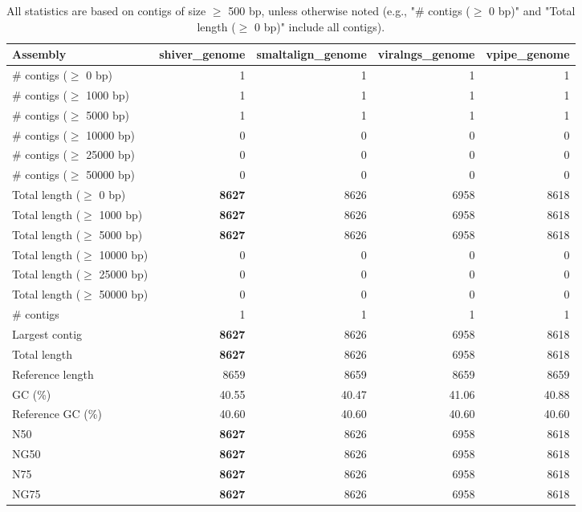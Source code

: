 \documentclass[12pt,a4paper]{article}
\begin{document}
\begin{table}[ht]
\begin{center}
\caption{All statistics are based on contigs of size $\geq$ 500 bp, unless otherwise noted (e.g., "\# contigs ($\geq$ 0 bp)" and "Total length ($\geq$ 0 bp)" include all contigs).}
\begin{tabular}{|l*{4}{|r}|}
\hline
Assembly & shiver\_genome & smaltalign\_genome & viralngs\_genome & vpipe\_genome \\ \hline
\# contigs ($\geq$ 0 bp) & 1 & 1 & 1 & 1 \\ \hline
\# contigs ($\geq$ 1000 bp) & 1 & 1 & 1 & 1 \\ \hline
\# contigs ($\geq$ 5000 bp) & 1 & 1 & 1 & 1 \\ \hline
\# contigs ($\geq$ 10000 bp) & 0 & 0 & 0 & 0 \\ \hline
\# contigs ($\geq$ 25000 bp) & 0 & 0 & 0 & 0 \\ \hline
\# contigs ($\geq$ 50000 bp) & 0 & 0 & 0 & 0 \\ \hline
Total length ($\geq$ 0 bp) & {\bf 8627} & 8626 & 6958 & 8618 \\ \hline
Total length ($\geq$ 1000 bp) & {\bf 8627} & 8626 & 6958 & 8618 \\ \hline
Total length ($\geq$ 5000 bp) & {\bf 8627} & 8626 & 6958 & 8618 \\ \hline
Total length ($\geq$ 10000 bp) & 0 & 0 & 0 & 0 \\ \hline
Total length ($\geq$ 25000 bp) & 0 & 0 & 0 & 0 \\ \hline
Total length ($\geq$ 50000 bp) & 0 & 0 & 0 & 0 \\ \hline
\# contigs & 1 & 1 & 1 & 1 \\ \hline
Largest contig & {\bf 8627} & 8626 & 6958 & 8618 \\ \hline
Total length & {\bf 8627} & 8626 & 6958 & 8618 \\ \hline
Reference length & 8659 & 8659 & 8659 & 8659 \\ \hline
GC (\%) & 40.55 & 40.47 & 41.06 & 40.88 \\ \hline
Reference GC (\%) & 40.60 & 40.60 & 40.60 & 40.60 \\ \hline
N50 & {\bf 8627} & 8626 & 6958 & 8618 \\ \hline
NG50 & {\bf 8627} & 8626 & 6958 & 8618 \\ \hline
N75 & {\bf 8627} & 8626 & 6958 & 8618 \\ \hline
NG75 & {\bf 8627} & 8626 & 6958 & 8618 \\ \hline

\end{tabular}
\end{center}
\end{table}
\end{document}
